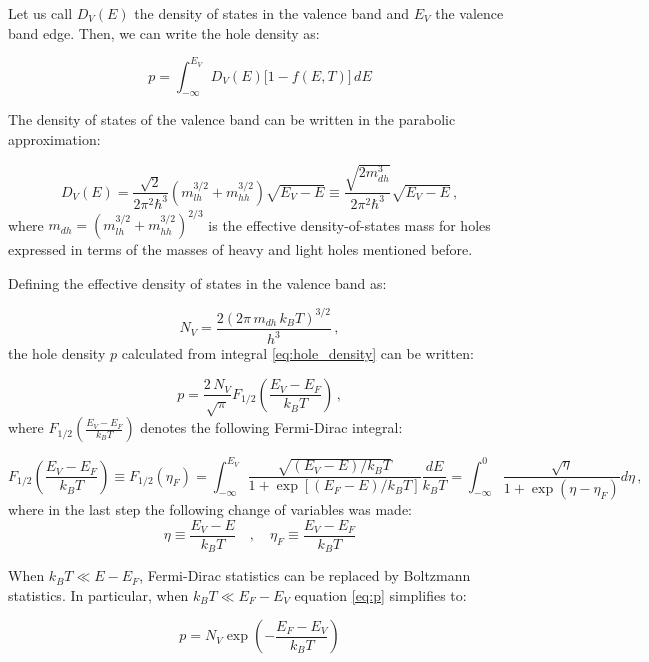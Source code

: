\documentclass[11pt,a4paper]{article}
\begin{document}
Let us call $D_V(E)$ the density of states in the valence band and $E_V$ the valence band edge. Then, we can write the hole density as:

\begin{equation}\label{eq:hole_density}
p=\int_{-\infty}^{E_V}D_V(E)\big[1-f(E,T)\big]\,dE
\end{equation}

The density of states of the valence band can be written in the parabolic approximation:

\begin{equation*}
D_V(E)=\frac{\sqrt{2}}{2\pi^2\hbar^3}\left(m_{lh}^{3/2}+m_{hh}^{3/2}\right)\sqrt{E_V-E}\equiv\frac{\sqrt{2m_{dh}^3}}{2\pi^2\hbar^3}\sqrt{E_V-E}\,,
\end{equation*}
where $m_{dh}=(m_{lh}^{3/2}+m_{hh}^{3/2})^{2/3}$ is the effective density-of-states mass for holes expressed in terms of the masses of heavy and light holes mentioned before.

Defining the effective density of states in the valence band as:

\begin{equation}\label{eq:Nv}
N_V=\frac{2\left(2\pi\,m_{dh}\,k_BT\right)^{3/2}}{h^3}\,,
\end{equation}
the hole density $p$ calculated from integral \eqref{eq:hole_density} can be written:

\begin{equation}\label{eq:p}
p=\frac{2\,N_V}{\sqrt{\pi}}F_{1/2}\!\left(\frac{E_V-E_F}{k_BT}\right)\,,
\end{equation}
where $F_{1/2}(\frac{E_V-E_F}{k_BT})$ denotes the following Fermi-Dirac integral:

\begin{equation*}
F_{1/2}\!\left(\frac{E_V-E_F}{k_BT}\right)\equiv F_{1/2}(\eta_F)=\int_{-\infty}^{E_V}\frac{\sqrt{(E_V-E)/k_BT}}{1+\exp\left[(E_F-E)/k_BT\right]}\frac{dE}{k_BT}=\int_{-\infty}^0\frac{\sqrt{\eta}}{1+\exp(\eta-\eta_F)}d\eta\,,
\end{equation*}
where in the last step the following change of variables was made:
\begin{equation*}
\eta\equiv\frac{E_V-E}{k_BT}\quad,\quad\eta_F\equiv\frac{E_V-E_F}{k_BT}
\end{equation*}

When $k_BT\ll E-E_F$, Fermi-Dirac statistics can be replaced by Boltzmann statistics. In particular, when $k_BT\ll E_F-E_V$ equation \eqref{eq:p} simplifies to:

\begin{equation}\label{eq::p}
p=N_V\exp\left(-\frac{E_F-E_V}{k_BT}\right)
\end{equation}
\end{document}
